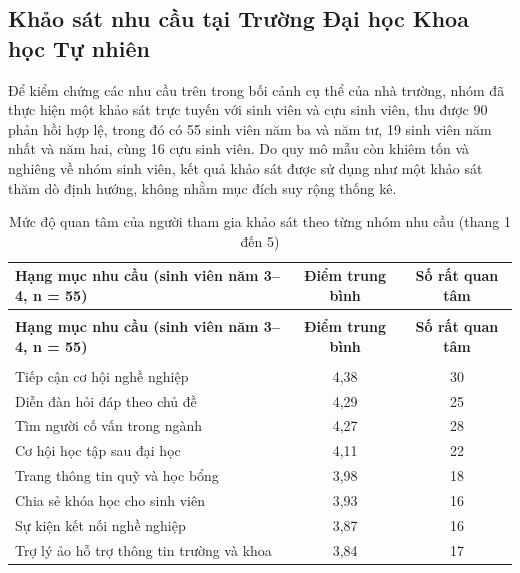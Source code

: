 \documentclass[12pt,a4paper,oneside]{report}
\begin{document}
\subsection{Khảo sát nhu cầu tại Trường Đại học Khoa học Tự nhiên}

Để kiểm chứng các nhu cầu trên trong bối cảnh cụ thể của nhà trường, nhóm đã thực hiện một khảo sát trực tuyến với sinh viên và cựu sinh viên, thu được 90 phản hồi hợp lệ, trong đó có 55 sinh viên năm ba và năm tư, 19 sinh viên năm nhất và năm hai, cùng 16 cựu sinh viên. Do quy mô mẫu còn khiêm tốn và nghiêng về nhóm sinh viên, kết quả khảo sát được sử dụng như một khảo sát thăm dò định hướng, không nhằm mục đích suy rộng thống kê.

\renewcommand{\arraystretch}{1.25}
{\small
\begin{longtable}{|>{\raggedright\arraybackslash}p{7.4cm}|c|c|}
\caption{Mức độ quan tâm của người tham gia khảo sát theo từng nhóm nhu cầu (thang 1 đến 5)}\label{tab:survey}\\
\hline \textbf{Hạng mục nhu cầu (sinh viên năm 3--4, n = 55)} & \textbf{Điểm trung bình} & \textbf{Số rất quan tâm} \\ \hline
\endfirsthead
\multicolumn{3}{l}{\itshape\small (tiếp theo trang trước)}\\[2pt]
\hline \textbf{Hạng mục nhu cầu (sinh viên năm 3--4, n = 55)} & \textbf{Điểm trung bình} & \textbf{Số rất quan tâm} \\ \hline
\endhead
\hline \multicolumn{3}{r}{\itshape\small (còn tiếp)}\\
\endfoot
\hline
\endlastfoot
Tiếp cận cơ hội nghề nghiệp & 4,38 & 30 \\ \hline
Diễn đàn hỏi đáp theo chủ đề & 4,29 & 25 \\ \hline
Tìm người cố vấn trong ngành & 4,27 & 28 \\ \hline
Cơ hội học tập sau đại học & 4,11 & 22 \\ \hline
Trang thông tin quỹ và học bổng & 3,98 & 18 \\ \hline
Chia sẻ khóa học cho sinh viên & 3,93 & 16 \\ \hline
Sự kiện kết nối nghề nghiệp & 3,87 & 16 \\ \hline
Trợ lý ảo hỗ trợ thông tin trường và khoa & 3,84 & 17 \\ \hline
\end{longtable}
}
\renewcommand{\arraystretch}{1}
\end{document}
